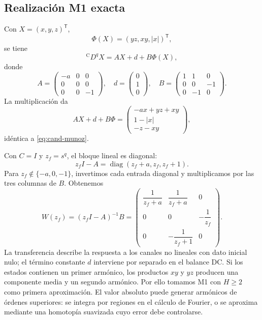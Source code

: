 \subsection{Realización M1 exacta}

Con \(X=(x,y,z)^{\mathsf T}\),
\[
 \Phi(X)=(yz,xy,|x|)^{\mathsf T},
\]
se tiene
\begin{equation}
 {}^{\mathrm C}D^qX=A X+d+B\Phi(X),
 \label{eq:cand-munoz-mimo}
\end{equation}
donde
\begin{equation}
 A=\begin{pmatrix}
 -a&0&0\\0&0&0\\0&0&-1
 \end{pmatrix},\quad
 d=\begin{pmatrix}0\\1\\0\end{pmatrix},\quad
 B=\begin{pmatrix}
 1&1&0\\
 0&0&-1\\
 0&-1&0
 \end{pmatrix}.
 \label{eq:cand-munoz-matrices}
\end{equation}
La multiplicación da
\[
 AX+d+B\Phi=
 \begin{pmatrix}
 -ax+yz+xy\\1-|x|\\-z-xy
 \end{pmatrix},
\]
idéntica a \cref{eq:cand-munoz}.

Con \(C=I\) y \(z_f=s^q\), el bloque lineal es diagonal:
\[
 z_fI-A=\operatorname{diag}(z_f+a,z_f,z_f+1).
\]
Para \(z_f\notin\{-a,0,-1\}\), invertimos cada entrada diagonal y
multiplicamos por las tres columnas de \(B\). Obtenemos
\begin{equation}
 W(z_f)=(z_fI-A)^{-1}B
 =\begin{pmatrix}
 \dfrac1{z_f+a}&\dfrac1{z_f+a}&0\\[0.8em]
 0&0&-\dfrac1{z_f}\\[0.8em]
 0&-\dfrac1{z_f+1}&0
 \end{pmatrix}.
 \label{eq:cand-munoz-transfer}
\end{equation}
La transferencia describe la respuesta a los canales no lineales con dato
inicial nulo; el término constante \(d\) interviene por separado en el
balance DC. Si los estados contienen un primer armónico, los productos
\(xy\) y \(yz\) producen una componente media y un segundo armónico.
Por ello tomamos M1 con \(H\ge2\) como primera aproximación. El valor
absoluto puede generar armónicos de órdenes superiores: se integra por
regiones en el cálculo de Fourier, o se aproxima mediante una homotopía
suavizada cuyo error debe controlarse.

